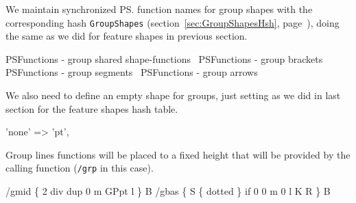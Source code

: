 \documentclass[11pt]{article}
\def\nwendcode{\endtrivlist \endgroup} %
\let\nwdocspar=\par                    %
\begin{document}
We maintain synchronized {\ps} function names for group shapes with the corresponding hash {\tt{}{}GroupShapes} (section~\ref{sec:GroupShapesHsh}, page~\pageref{sec:GroupShapesHsh}), doing the same as we did for feature shapes in previous section.

\nwenddocs{}\plusendmoddef
\LA{}PSFunctions - group shared shape-functions~{\nwtagstyle{}}\RA{}
\LA{}PSFunctions - group brackets~{\nwtagstyle{}}\RA{}
\LA{}PSFunctions - group segments~{\nwtagstyle{}}\RA{}
\LA{}PSFunctions - group arrows~{\nwtagstyle{}}\RA{}
\nwendcode{}\nwdocspar

We also need to define an empty shape for groups, just setting as we did in last section for the feature shapes hash table.

\nwenddocs{}\endmoddef
'none'                 => 'pt',
\nwendcode{}\nwdocspar

Group lines functions will be placed to a fixed height that will be provided by the calling function ({\tt{}/\protect{}grp} in this case).

\nwenddocs{}\endmoddef
/gmid \{     %
  2 div     %
  dup       %
  0 m       %
  GPpt l    %
\} B         %
/gbas \{       %
  S           %
    \{         %
      dotted  %
    \} if      %
    0 0 m     %
    0 l       %
    K         %
  R           %
\} B           %
\eatline
{}\nwendcode{}\nwdocspar
\end{document}
